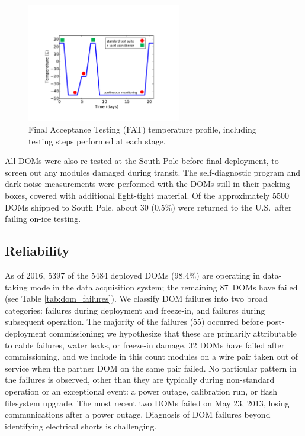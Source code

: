 \begin{figure}[!h]
 \centering
 \includegraphics[width=0.6\textwidth]{graphics/dom/production/fat_cycle.pdf}
 \caption{Final Acceptance Testing (FAT) temperature profile, including
   testing steps performed at each stage.}
 \label{fig:fat_cycle}
\end{figure}

All DOMs were also re-tested at the South Pole before final deployment, to
screen out any modules damaged during transit.  The self-diagnostic
program and dark noise measurements were performed with the DOMs still in
their packing boxes, covered with additional light-tight material.  Of the
approximately 5500 DOMs shipped to South Pole, about 30 (0.5\%) were
returned to the U.S.~after failing on-ice testing.    

\subsection{\label{sec:reliability}Reliability}

As of 2016, 5397 of the 5484 deployed DOMs ($98.4\%$) are operating in
data-taking mode in the data acquisition system; the remaining 87~DOMs
have failed (see Table
\ref{tab:dom_failures}).  We classify DOM 
failures into two broad categories: failures during deployment and
freeze-in, and failures during subsequent operation.  The majority of the
failures (55) occurred before post-deployment commissioning; we hypothesize
that these are primarily attributable to cable failures, water leaks,
or freeze-in damage. 32 DOMs have failed after commissioning, and
we include in this count modules on a wire pair taken out of service when
the partner DOM on the same pair failed.  No particular pattern in the
failures is observed, other than they are typically during non-standard
operation or an exceptional event: a power outage, calibration run, or
flash filesystem upgrade.  The most recent two DOMs failed on May 23, 2013,
losing communications after a power outage.  Diagnosis of DOM failures
beyond identifying electrical shorts is challenging.

